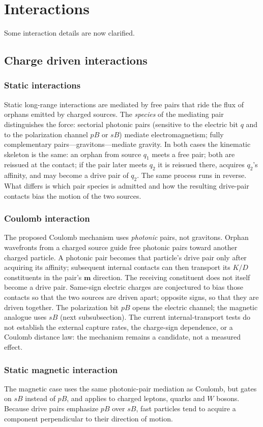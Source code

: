 \documentclass[a4paper]{article}
\begin{document}
\section{Interactions\label{sec:Interactions}}
Some interaction details are now clarified.
\subsection{Charge driven interactions}
\subsubsection{Static interactions}
Static long-range interactions are mediated by free pairs that ride the flux of orphans emitted by charged sources. The \emph{species} of the mediating pair distinguishes the force: sectorial photonic pairs (sensitive to the electric bit $q$ and to the polarization channel $pB$ or $sB$) mediate electromagnetism; fully complementary pairs---gravitons---mediate gravity. In both cases the kinematic skeleton is the same: an orphan from source $q_1$ meets a free pair; both are reissued at the contact; if the pair later meets $q_2$ it is reissued there, acquires $q_2$'s affinity, and may become a drive pair of $q_2$. The same process runs in reverse. What differs is which pair species is admitted and how the resulting drive-pair contacts bias the motion of the two sources.
\subsubsection{Coulomb interaction} \label{subsec:Coulomb-interaction}
The proposed Coulomb mechanism uses \emph{photonic} pairs, not gravitons. Orphan wavefronts from a charged source guide free photonic pairs toward another charged particle. A photonic pair becomes that particle's drive pair only after acquiring its affinity; subsequent internal contacts can then transport its $K/D$ constituents in the pair's $\boldsymbol{m}$ direction. The receiving constituent does not itself become a drive pair. Same-sign electric charges are conjectured to bias those contacts so that the two sources are driven apart; opposite signs, so that they are driven together. The polarization bit $pB$ opens the electric channel; the magnetic analogue uses $sB$ (next subsubsection). The current internal-transport tests do not establish the external capture rates, the charge-sign dependence, or a Coulomb distance law: the mechanism remains a candidate, not a measured effect.
\subsubsection{Static magnetic interaction}
The magnetic case uses the same photonic-pair mediation as Coulomb, but gates on $sB$ instead of $pB$, and applies to charged leptons, quarks and $W$ bosons. Because drive pairs emphasize $pB$ over $sB$, fast particles tend to acquire a component perpendicular to their direction of motion.
\end{document}
